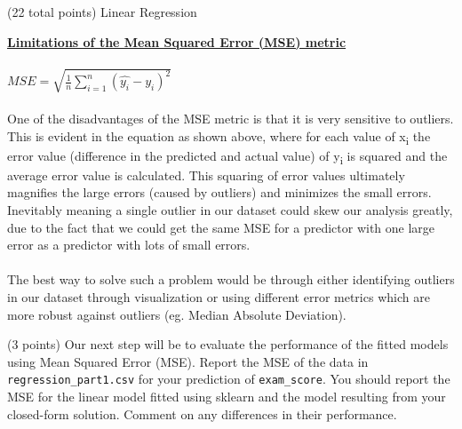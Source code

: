 \documentclass[12pt]{article}
\begin{document}
\begin{question}{(22 total points) Linear Regression}
\begin{subquestion}
\begin{answerbox}{22em}
\large{\textbf{\underline{Limitations of the Mean Squared Error (MSE) metric}}}\\
\\
\normalsize{
$MSE = \sqrt{\frac{1}{n}\sum_{i=1}^{n}(\hat{y_i}-y_i)^2}$\\
\\
One of the disadvantages of the MSE metric is that it is very sensitive to outliers. This is evident in the equation as shown above, where for each value of x\textsubscript{i} the error value (difference in the predicted and actual value) of y\textsubscript{i} is squared and the average error value is calculated. This squaring of error values ultimately magnifies the large errors (caused by outliers) and minimizes the small errors. Inevitably meaning a single outlier in our dataset could skew our analysis greatly, due to the fact that we could get the same MSE for a predictor with one large error as a predictor with lots of small errors.\\
\\
The best way to solve such a problem would be through either identifying outliers in our dataset through visualization or using different error metrics which are more robust against outliers (eg. Median Absolute Deviation).}
\end{answerbox}



\end{subquestion}


 
%
%
\begin{subquestion}{(3 points) Our next step will be to evaluate the performance of the fitted models using Mean Squared Error (MSE). 
Report the MSE of the data in \texttt{regression\_part1.csv} for your prediction of \texttt{exam\_score}.
You should report the MSE for the linear model fitted using sklearn and the model resulting from your closed-form solution. 
Comment on any differences in their performance. 
}



\end{subquestion}
\end{question}
\end{document}
